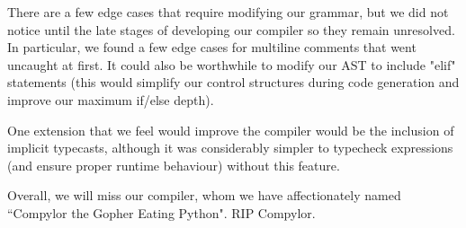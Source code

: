\documentclass{article}
\begin{document}
There are a few edge cases that require modifying our grammar, but we did not notice until the late stages of developing our compiler so they remain unresolved. In particular, we found a few edge cases for multiline comments that went uncaught at first. It could also be worthwhile to modify our AST to include "elif" statements (this would simplify our control structures during code generation and improve our maximum if/else depth).

One extension that we feel would improve the compiler would be the inclusion of implicit typecasts, although it was considerably simpler to typecheck expressions (and ensure proper runtime behaviour) without this feature.

Overall, we will miss our compiler, whom we have affectionately named ``Compylor the Gopher Eating Python". RIP Compylor.
\end{document}
